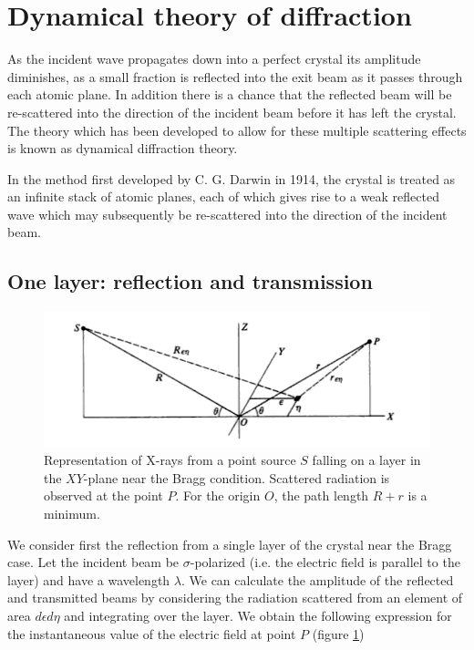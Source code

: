 \documentclass[12pt,oneside,notitlepage,abstracton,a4paper]{scrartcl}
\begin{document}
\section{Dynamical theory of diffraction}
As the incident wave propagates down into a perfect crystal its amplitude diminishes, as a small fraction is reflected into the exit beam as it passes through each atomic plane. In addition there is a chance that the reflected beam will be re-scattered into the direction of the incident beam before it has left the crystal. The theory which has been developed to allow for these multiple scattering effects is known as dynamical diffraction theory.

In the method first developed by C. G. Darwin in 1914, the crystal is treated as an infinite stack of atomic planes, each of which gives rise to a weak reflected wave which may subsequently be re-scattered into the direction of the incident beam.


\subsection{One layer: reflection and transmission}\label{onelayer}

\begin{figure}[h]
\begin{center}
\includegraphics[width=12cm]{pics/picture1.png}
\caption{Representation of X-rays from a point source $S$ falling on a layer in the $XY$-plane near the Bragg condition. Scattered radiation is observed at the point $P$. For the origin $O$, the path length $R+r$ is a minimum.}
\label{pic1}
\end{center}
\end{figure}

We consider first the reflection from a single layer of the crystal near the Bragg case. Let the incident beam be $\sigma$-polarized (i.e. the electric field is parallel to the layer) and have a wavelength $\lambda$. We can calculate the amplitude of the reflected and transmitted beams by considering the radiation scattered from an element of area $d\epsilon d\eta$ and integrating over the layer. We obtain the following expression for the instantaneous value of the electric field at point $P$ (figure \ref{pic1})
\end{document}
